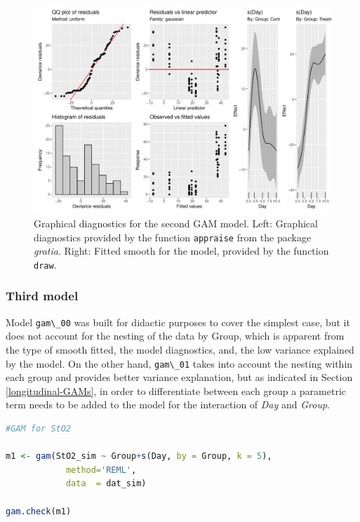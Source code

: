 \documentclass[
]{article}
\newcommand{\passthrough}[1]{#1}
\begin{document}
\begin{figure}[H]

{\centering \includegraphics[width=0.75\linewidth,]{00-Full_document_files/figure-latex/second-GAM-diag-1} 

}

\caption{Graphical diagnostics for the second GAM model. Left: Graphical diagnostics provided by the function \passthrough{\lstinline!appraise!} from the package \emph{gratia}. Right: Fitted smooth for the model, provided by the function \passthrough{\lstinline!draw!}.}\label{fig:second-GAM-diag}
\end{figure}

\hypertarget{third-model}{%
\subsubsection{Third model}\label{third-model}}

Model \passthrough{\lstinline!gam\_00!} was built for didactic purposes to cover the simplest case, but it does not account for the nesting of the data by Group, which is apparent from the type of smooth fitted, the model diagnostics, and, the low variance explained by the model. On the other hand, \passthrough{\lstinline!gam\_01!} takes into account the nesting within each group and provides better variance explanation, but as indicated in Section \ref{longitudinal-GAMs}, in order to differentiate between each group a parametric term needs to be added to the model for the interaction of \emph{Day} and \emph{Group}.

\begin{lstlisting}[language=R]
#GAM for StO2

m1 <- gam(StO2_sim ~ Group+s(Day, by = Group, k = 5),
            method='REML',
            data  = dat_sim)

gam.check(m1)
\end{lstlisting}
\end{document}
